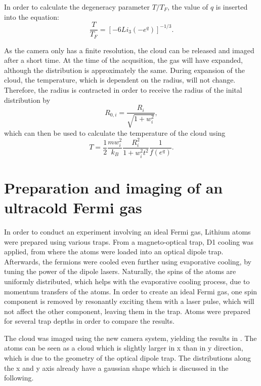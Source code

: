 In order to calculate the degeneracy parameter $T/T_F$, the value of $q$ is inserted into the equation:
\begin{equation}
\label{eq:tovertf}
\frac{T}{T_F} = \left[ -6 Li_3(-e^q) \right]^{-1/3}.
\end{equation}

As the camera only has a finite resolution, the cloud can be released and imaged after a short time. At the time of the acqusition, the gas will have expanded, although the distribution is approximately the same. During expansion of the cloud, the temperature, which is dependent on the radius, will not change. Therefore, the radius is contracted in order to receive the radius of the inital distribution by
\begin{equation}
R_{0,i} = \frac{R_{i}}{\sqrt{1+ w_i^2}},
\end{equation}
which can then be used to calculate the temperature of the cloud using
\begin{equation}
\label{eq:temp}
T = \frac{1}{2} \frac{mw_i^2}{k_B} \frac{R_i^2}{1+w_i^2t^2}\frac{1}{f(e^q)}.
\end{equation}


	
\section{Preparation and imaging of an ultracold Fermi gas}
\label{sec:fermiexperiment}

In order to conduct an experiment involving an ideal Fermi gas, Lithium atoms were prepared using various traps. From a magneto-optical trap, D1 cooling was applied, from where the atoms were loaded into an optical dipole trap. Afterwards, the fermions were cooled even further using evaporative cooling, by tuning the power of the dipole lasers. Naturally, the spins of the atoms are uniformly distributed, which helps with the evaporative cooling process, due to momentum transfers of the atoms. In order to create an ideal Fermi gas, one spin component is removed by resonantly exciting them with a laser pulse, which will not affect the other component, leaving them in the trap. Atoms were prepared for several trap depths in order to compare the results.

The cloud was imaged using the new camera system, yielding the results in . The atoms can be seen as a cloud which is slightly larger in x than in y direction, which is due to the geometry of the optical dipole trap. The distributions along the x and y axis already have a gaussian shape which is discussed in the following.

